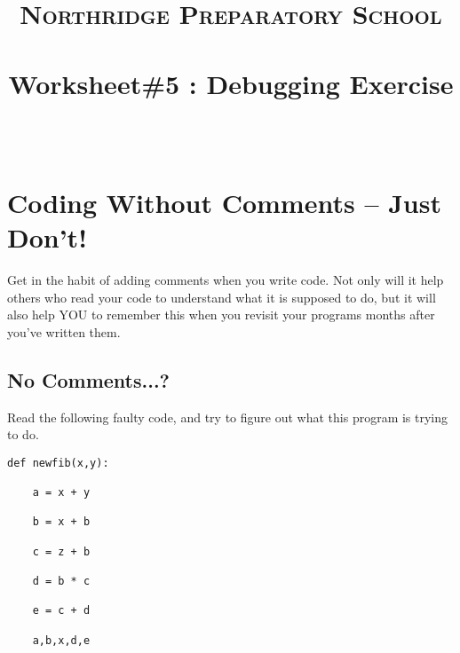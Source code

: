 \documentclass[paper=a4, fontsize=11pt]{scrartcl} %
\title{	
\normalfont \normalsize 
\textsc{Northridge Preparatory School} \\ [25pt] %
\horrule{0.5pt} \\[0.4cm] %
\huge Worksheet\#5 : Debugging Exercise \\ %
\horrule{2pt} \\[0.5cm] %
}
\author{} %
\date{} %
\numberwithin{equation}{section} %
\numberwithin{figure}{section} %
\numberwithin{table}{section} %
\begin{document}
\maketitle %


\section{Coding Without Comments -- Just Don't!}

     Get in the habit of adding comments when you write code.  Not only will it help others who read your code to understand what it is supposed to do, but it will also help YOU to remember this when you revisit your programs months after you've written them.
     
     
\subsection{No Comments...?}

Read the following faulty code, and try to figure out what this program is trying to do.


\begin{framed}
\begin{lstlisting}
def newfib(x,y):

    a = x + y

    b = x + b

    c = z + b

    d = b * c

    e = c + d

    a,b,x,d,e
\end{lstlisting}
\end{framed}
\end{document}
